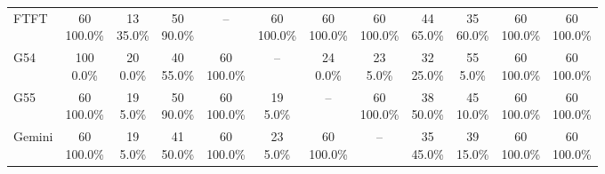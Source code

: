 \documentclass[11pt]{article}
\begin{document}
\begin{table}[H]
{\begin{tabular}{lccccccccccc}
FTFT & \shortstack{60\\100.0\%} & \shortstack{13\\35.0\%} & \shortstack{50\\90.0\%} & -- & \shortstack{60\\100.0\%} & \shortstack{60\\100.0\%} & \shortstack{60\\100.0\%} & \shortstack{44\\65.0\%} & \shortstack{35\\60.0\%} & \shortstack{60\\100.0\%} & \shortstack{60\\100.0\%} \\
G54 & \shortstack{100\\0.0\%} & \shortstack{20\\0.0\%} & \shortstack{40\\55.0\%} & \shortstack{60\\100.0\%} & -- & \shortstack{24\\0.0\%} & \shortstack{23\\5.0\%} & \shortstack{32\\25.0\%} & \shortstack{55\\5.0\%} & \shortstack{60\\100.0\%} & \shortstack{60\\100.0\%} \\
G55 & \shortstack{60\\100.0\%} & \shortstack{19\\5.0\%} & \shortstack{50\\90.0\%} & \shortstack{60\\100.0\%} & \shortstack{19\\5.0\%} & -- & \shortstack{60\\100.0\%} & \shortstack{38\\50.0\%} & \shortstack{45\\10.0\%} & \shortstack{60\\100.0\%} & \shortstack{60\\100.0\%} \\
Gemini & \shortstack{60\\100.0\%} & \shortstack{19\\5.0\%} & \shortstack{41\\50.0\%} & \shortstack{60\\100.0\%} & \shortstack{23\\5.0\%} & \shortstack{60\\100.0\%} & -- & \shortstack{35\\45.0\%} & \shortstack{39\\15.0\%} & \shortstack{60\\100.0\%} & \shortstack{60\\100.0\%} \\

\end{tabular}}
\end{table}
\end{document}
